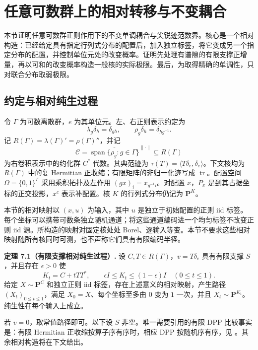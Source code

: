 \documentclass[UTF8,zihao=-4,a4paper]{ctexart}
\numberwithin{equation}{section}
\begin{document}
\clearpage
\section{任意可数群上的相对转移与不变耦合}\label{sec:cd}

本节证明任意可数群正则作用下的不变单调耦合与尖锐迹范数界。核心是一个相对构造：已经给定具有指定行列式分布的配置后，加入独立标签，将它变成另一个指定分布的配置，并控制单位元处的改变概率。证明先处理有谱隙的有限支撑正增量，再以可和的改变概率构造一般核的实际极限。最后，为取得精确的单调性，只对联合分布取弱极限。

\subsection{约定与相对纯生过程}\label{cd:setup}

令 $\Gamma$ 为可数离散群，$e$ 为其单位元。左、右正则表示约定为
\[
\lambda_g\delta_h=\delta_{gh},\qquad
\rho_g\delta_h=\delta_{hg^{-1}}.
\]
记 $R(\Gamma)=\lambda(\Gamma)'=\rho(\Gamma)''$，并记
\[
\mathcal C=\overline{\operatorname{span}\{\rho_g:g\in\Gamma\}}^{\|\cdot\|}
\subseteq R(\Gamma)
\]
为右卷积表示中的约化群 $C^*$ 代数。其典范迹为
$\tau(T)=\langle T\delta_e,\delta_e\rangle$。下文核均为 $R(\Gamma)$ 中的复 Hermitian 正收缩；有限矩阵的非归一化迹写成 $\operatorname{tr}$。配置空间
$\Omega=\{0,1\}^{\Gamma}$ 采用乘积拓扑及左作用
$(gx)_i=x_{g^{-1}i}$。对配置 $x$，$P_x$ 是到其占据坐标的正交投影，$x^c$ 表示补配置。核 $K$ 的行列式分布仍记为 $\mathbf P^K$。

本节的相对映射以 $(x,u)$ 为输入，其中 $u$ 是独立于初始配置的正则 iid 标签。每个坐标可以携带可数条独立随机通道；将这些通道编码进一个均匀标签不改变正则 iid 源。所构造的映射对固定核处处 Borel、逐输入等变。本节不要求这些相对映射随所有核同时可测，也不声称它们具有有限编码半径。

\textbf{定理 7.1（有限支撑相对纯生过程）.}
设 $C,T\in R(\Gamma)$，$v=T\delta_e$ 具有有限支撑 $S$，并且存在 $\epsilon>0$ 使
\begin{equation}
K_t=C+tTT^*,\qquad
\epsilon I\le K_t\le(1-\epsilon)I\quad(0\le t\le1).
\label{cd:gappedpath}
\end{equation}
给定 $X\sim\mathbf P^C$ 和独立正则 iid 标签，存在上述意义的相对映射，产生路径 $(X_t)_{0\le t\le1}$，满足 $X_0=X$、每个坐标至多由 $0$ 变为 $1$ 一次，并且
$X_t\sim\mathbf P^{K_t}$。纯生性在每个输入上成立。

若 $v=0$，取常值路径即可。以下设 $S$ 非空。唯一需要引用的有限 DPP 比较事实是：有限 Hermitian 正收缩按算子序有序时，相应 DPP 按随机序有序，见 \cite[Theorem 2.1]{LT}。其余相对构造将在下文给出。
\end{document}
